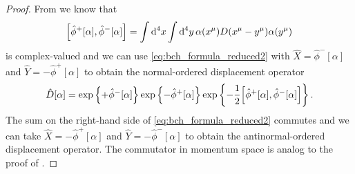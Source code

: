 \qkgdisplacementordered
\begin{proof}
	From  we know that
	\begin{equation*}
		\comm{\hat\phi^+[\alpha]}{\hat\phi^-[\alpha]}
		=
		\int\dd[4]{x}
		\int\dd[4]{y}
		\alpha(x^\mu)
		D(x^\mu-y^\mu)
		\alpha(y^\mu)
	\end{equation*}
	is complex-valued and we can use \cref{eq:bch_formula_reduced2} with $\hat{X}=\hat\phi^-[\alpha]$ and $\hat{Y}=-\hat\phi^+[\alpha]$ to obtain the normal-ordered displacement operator
	\begin{equation*}
		\hat{D}[\alpha]
		=
		\exp\left\{
			+
			\hat\phi^-[\alpha]
		\right\}
		\exp\left\{
			-
			\hat\phi^+[\alpha]
		\right\}
		\exp\left\{
			-
			\frac{1}{2}
			\comm{\hat\phi^+[\alpha]}{\hat\phi^-[\alpha]}
		\right\}
		.
	\end{equation*}
	The sum on the right-hand side of \cref{eq:bch_formula_reduced2} commutes and we can take $\hat{X}=-\hat\phi^+[\alpha]$ and $\hat{Y}=-\hat\phi^-[\alpha]$ to obtain the antinormal-ordered displacement operator.
	The commutator in momentum space is analog to the proof of .
\end{proof}
\qkgdisplacementproduct
